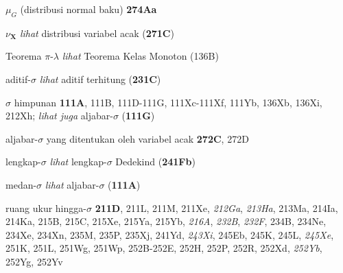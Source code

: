 \indexmedskip\indexheader{$\scriptstyle\pmb{\mu}$}

$\mu_G$ (distribusi normal baku) {\bf 274Aa}




\indexmedskip\indexheader{$\scriptstyle\pmb{\nu}$}

$\nu_{\pmb{X}}$ {\it lihat} distribusi variabel acak
({\bf 271C})




\indexmedskip
\indexheader{$\scriptstyle\pmb{\pi}$}















Teorema $\pi$-$\lambda$ {\it lihat} Teorema Kelas Monoton (136B)

\indexmedskip





\indexmedskip
\indexheader{$\scriptstyle\pmb{\sigma}$}

aditif-$\sigma$ {\it lihat} aditif terhitung ({\bf 231C})






$\sigma$ himpunan {\bf 111A}, 111B,
111D-111G, 
111Xc-111Xf, 
111Yb, 136Xb, 136Xi,
  212Xh; 
  {\it lihat juga}
aljabar-$\sigma$ ({\bf 111G})


aljabar-$\sigma$ yang ditentukan oleh variabel acak {\bf 272C},
272D








lengkap-$\sigma$ {\it lihat} lengkap-$\sigma$ Dedekind
({\bf 241Fb})






medan-$\sigma$ {\it lihat} aljabar-$\sigma$ ({\bf 111A})







ruang ukur hingga-$\sigma$ {\bf 211D}, 211L, 211M, 211Xe,
{\it 212Ga}, {\it 213Ha}, 213Ma, 214Ia, 214Ka, 215B, 215C, 215Xe,
215Ya, 215Yb, {\it 216A}, {\it 232B}, {\it 232F},
234B, 234Ne, 234Xe, 234Xn, 235M, 235P,
235Xj, 241Yd, {\it 243Xi}, 245Eb, 245K, 245L, {\it 245Xe}, 251K,
251L, 251Wg, 251Wp, 252B-252E, 
252H, 252P, 252R, 252Xd, {\it 252Yb}, 252Yg, 252Yv








